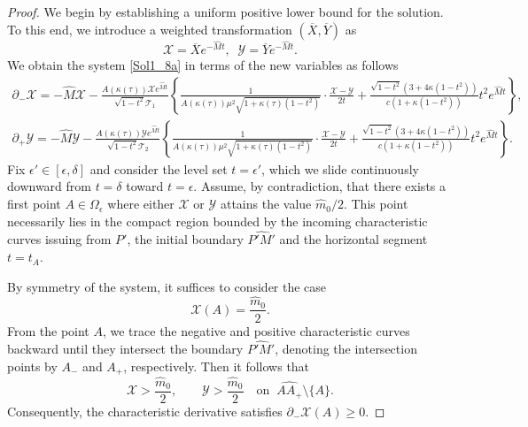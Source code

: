 \documentclass[3p,11pt]{elsarticle}
\numberwithin{equation}{section}
\begin{document}
\begin{proof}
We begin by establishing a uniform positive lower bound for the solution. 
To this end, we introduce a weighted transformation $(\overline{X}, \overline{Y})$ as
    \begin{equation*}\label{l12}
        \mathcal{X}=\overline{X}e^{-\hat M t}, \;\;  \mathcal{Y}=\overline{Y}e^{-\hat M t}.
    \end{equation*}
    We obtain the system \eqref{Sol1_8a} in terms of the new variables as follows
    \begin{equation}\label{l13} 
        \begin{split}
            \partial_-\mathcal{X} = -\hat M \mathcal{X}-\frac{A(\kappa(\tau))\mathcal{X}e^{\hat M t}}{\sqrt{1-t^2}\mathcal{T}_1} \left\{\frac{1}{A(\kappa(\tau))\mu^2\sqrt{1+\kappa(\tau)(1-t^2)}}\cdot\frac{\mathcal{X}- \mathcal{Y}}{2t}+\frac{\sqrt{1-t^2}(3+4\kappa(1-t^2))}{c(1+\kappa(1-t^2))}t^2e^{\hat M t}\right\},\\
             \partial_+\mathcal{Y} =-\hat M \mathcal{Y}-\frac{A(\kappa(\tau)) \mathcal{Y}e^{\hat M t}}{\sqrt{1-t^2}\mathcal{T}_2} \left\{\frac{1}{A(\kappa(\tau))\mu^2\sqrt{1+\kappa(\tau)(1-t^2)}}\cdot\frac{\mathcal{X}- \mathcal{Y}}{2t}+\frac{\sqrt{1-t^2}(3+4\kappa(1-t^2))}{c(1+\kappa(1-t^2))}t^2e^{\hat M t}\right\}.
        \end{split}
    \end{equation}  
    Fix $\epsilon'\in[\epsilon,\delta]$ and consider the level set $t=\epsilon'$, which we slide continuously downward from $t=\delta$ toward $t=\epsilon$. Assume, by contradiction, that there exists a first point $A\in\Omega_\epsilon$ where either $\mathcal{X}$ or $\mathcal{Y}$ attains the value $\hat m_0/2$. This point necessarily lies in the compact region bounded by the incoming characteristic curves issuing from $P'$, the initial boundary $\widehat{P'M'}$ and the horizontal segment $t=t_A$.


    By symmetry of the system, it suffices to consider the case
    \[
      \mathcal{X}(A)=\frac{\hat{m}_0}{2}.
    \]
    From the point $A$, we trace the negative and positive characteristic curves backward until they intersect the boundary $\widehat{P'M'}$, denoting the intersection points by $A_{-}$ and $A_{+}$, respectively. Then it follows that
    \[
      \mathcal{X}>\frac{\hat{m}_0}{2}, 
      \qquad 
      \mathcal{Y}>\frac{\hat{m}_0}{2}
      \quad \text{on} \; \; \widehat{AA_+}\setminus\{A\}.
    \]
     Consequently, the characteristic derivative satisfies $\partial_-\mathcal{X}(A)\ge 0$.
     

\end{proof}
\end{document}

